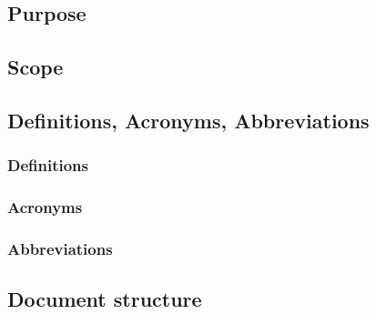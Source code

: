 \subsection{Purpose}
\subsection{Scope}
\subsection{Definitions, Acronyms, Abbreviations}
\subsubsection{Definitions}
\subsubsection{Acronyms}
\subsubsection{Abbreviations}
\subsection{Document structure}